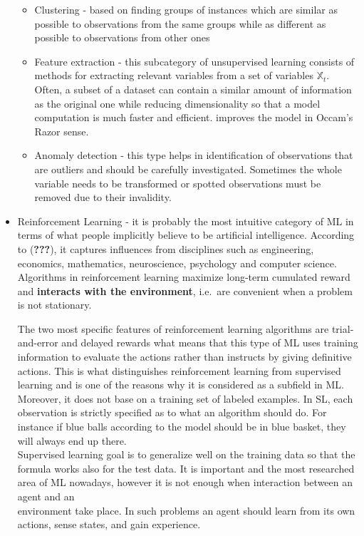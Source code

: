 \documentclass[]{article}
\providecommand{\tightlist}{%
  \setlength{\itemsep}{0pt}\setlength{\parskip}{0pt}}
\begin{document}
\begin{itemize}
  \begin{itemize}
  \tightlist
  \item
    Clustering - based on finding groups of instances which are similar
    as possible to observations from the same groups while as different
    as possible to observations from other ones
  \item
    Feature extraction - this subcategory of unsupervised learning
    consists of methods for extracting relevant variables from a set of
    variables \(\mathbb{X}_t\). Often, a subset of a dataset can contain
    a similar amount of information as the original one while reducing
    dimensionality so that a model computation is much faster and
    efficient. improves the model in Occam's Razor sense.
  \item
    Anomaly detection - this type helps in identification of
    observations that are outliers and should be carefully investigated.
    Sometimes the whole variable needs to be transformed or spotted
    observations must be removed due to their invalidity.
  \end{itemize}
\item
  Reinforcement Learning - it is probably the most intuitive category of
  ML in terms of what people implicitly believe to be artificial
  intelligence. According to ({\textbf{???}}), it captures influences
  from disciplines such as engineering, economics, mathematics,
  neuroscience, psychology and computer science. Algorithms in
  reinforcement learning maximize long-term cumulated reward and
  \textbf{interacts with the environment}, i.e.~are convenient when a
  problem is not stationary.

  The two most specific features of reinforcement learning algorithms
  are trial-and-error and delayed rewards what means that this type of
  ML uses training information to evaluate the actions rather than
  instructs by giving definitive actions. This is what distinguishes
  reinforcement learning from supervised learning and is one of the
  reasons why it is considered as a subfield in ML. Moreover, it does
  not base on a training set of labeled examples. In SL, each
  observation is strictly specified as to what an algorithm should do.
  For instance if blue balls according to the model should be in blue
  basket, they will always end up there.\\
  Supervised learning goal is to generalize well on the training data so
  that the formula works also for the test data. It is important and the
  most researched area of ML nowadays, however it is not enough when
  interaction between an agent and an\\
  environment take place. In such problems an agent should learn from
  its own actions, sense states, and gain experience.


\end{itemize}
\end{document}
